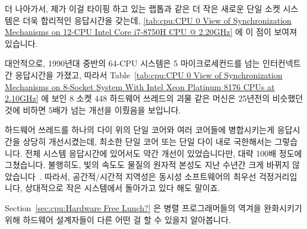 {	더 나아가서, 제가 이걸 타이핑 하고 있는 랩톱과 같은 더 작은 새로운 단일
	소켓 시스템은 더욱 합리적인 응답시간을 갖는데,
	\cref{tab:cpu:CPU 0 View of Synchronization Mechanisms on 12-CPU Intel Core i7-8750H CPU @ 2.20GHz}
	에 이 점이 보여져 있습니다.

	대안적으로, 1990년대 중반의 64-CPU 시스템은 5 마이크로세컨드를 넘는
	인터컨넥트간 응답시간을 가졌고, 따라서
	Table~\ref{tab:cpu:CPU 0 View of Synchronization Mechanisms on 8-Socket System With Intel Xeon Platinum 8176 CPUs at 2.10GHz}
	에 보인 8 소켓 448 하드웨어 쓰레드의 괴물 같은 머신은 25년전의 비슷했던
	것에 비하면 5배가 넘는 개선을 이뤘음을 보입니다.

	하드웨어 쓰레드를 하나의 다이 위의 단일 코어와 여러 코어들에
	병합시키는게 응답시간을 상당히 개선시켰는데, 최소한 단일 코어 또는 단일
	다이 내로 국한해서는 그렇습니다.
	전체 시스템 응답시간에 있어서도 약간 개선이 있었습니다만, 대략 100배
	정도에 그쳤습니다.
	불행히도, 빛의 속도도 물질의 원자적 본성도 지난 수년간 크게 바뀌지
	않았습니다~\cite{NoBugsHare2016CPUoperations}.
	따라서, 공간적/시간적 지역성은 동시성 소프트웨어의 최우선
	걱정거리입니다, 상대적으로 작은 시스템에서 돌아가고 있다 해도 말이죠.

	Section~\ref{sec:cpu:Hardware Free Lunch?}
	은 병렬 프로그래머들의 역겨을 완화시키기 위해 하드웨어 설계자들이 다른
	어떤 걸 할 수 있을지 알아봅니다.

}\QuickQuizEnd

